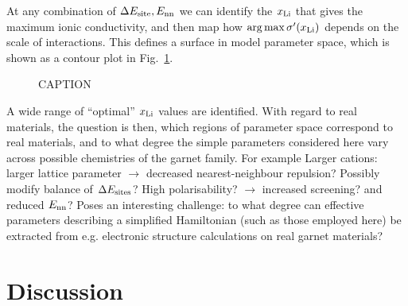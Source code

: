 \documentclass[aps,prb,twocolumn,superscriptaddress,reprint]{revtex4-1}
\newcommand{\xLi}{x_\m{Li}}
\begin{document}
At any combination of $\Delta E_{\mathrm{site}}, E_{\mathrm{nn}}$ we can identify the $\xLi$ that gives the maximum ionic conductivity, and then map how $\arg\max \sigma^\prime(\xLi)$ depends on the scale of interactions. 
This defines a surface in model parameter space, which is shown as a contour plot in Fig.\ \ref{fig:max_sigma}.
\begin{figure}[tb]
  \centering
    \caption{\label{fig:max_sigma}CAPTION}
\end{figure}
A wide range of ``optimal'' $\xLi$ values are identified. 
With regard to real materials, the question is then, which regions of parameter space correspond to real materials, and to what degree the simple parameters considered here vary across possible chemistries  of the garnet family. 
For example  Larger cations: larger lattice parameter $\to$ decreased nearest-neighbour repulsion? Possibly modify balance of $\Delta E_{\mathrm{sites}}$? High polarisability? $\to$ increased screening? and reduced $E_{\mathrm{nn}}$? Poses an interesting challenge: to what degree can effective parameters describing a simplified Hamiltonian (such as those employed here) be extracted from e.g. electronic structure calculations on real garnet materials?

\section{Discussion}
\end{document}
